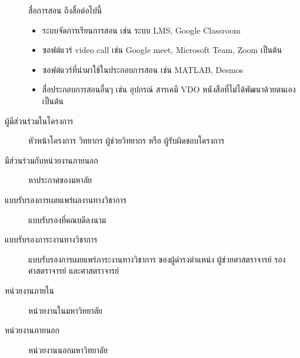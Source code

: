 \documentclass[a4paper,12pt,english]{sphinxmanual}
\begin{document}
\begin{description}
\begin{itemize}
\end{itemize}

สื่อการสอน  ถึงสื่อต่อไปนี้
\begin{itemize}
\item {} 
ระบบจัดการเรียนการสอน เช่น ระบบ LMS, Google Classroom

\item {} 
ซอฟต์แวร์ video call เช่น Google meet, Microsoft Team, Zoom เป็นต้น

\item {} 
ซอฟต์แวร์ที่นำมาใช้ในประกอบการสอน เช่น MATLAB, Desmos

\item {} 
สื่อประกอบการสอนอื่นๆ เช่น อุปกรณ์ สารเคมี VDO หนังสือที่ไม่ได้พัฒนาด้วยตนเอง เป็นต้น

\end{itemize}

\item[{ผู้มีส่วนร่วมในโครงการ\index{ผู้มีส่วนร่วมในโครงการ@\spxentry{ผู้มีส่วนร่วมในโครงการ}|spxpagem}\phantomsection\label{\detokenize{glossary:term-5}}}] \leavevmode
หัวหน้าโครงการ วิทยากร ผู้ช่วยวิทยากร หรือ ผู้รับผิดชอบโครงการ

\item[{มีส่วนร่วมกับหน่วยงานภายนอก\index{มีส่วนร่วมกับหน่วยงานภายนอก@\spxentry{มีส่วนร่วมกับหน่วยงานภายนอก}|spxpagem}\phantomsection\label{\detokenize{glossary:term-6}}}] \leavevmode
หาประกาศของมหาลัย

\item[{แบบรับรองการเผยแพร่ผลงานทางวิชาการ\index{แบบรับรองการเผยแพร่ผลงานทางวิชาการ@\spxentry{แบบรับรองการเผยแพร่ผลงานทางวิชาการ}|spxpagem}\phantomsection\label{\detokenize{glossary:term-7}}}] \leavevmode
แบบรับรองที่คณบดีลงนาม

\item[{แบบรับรองภาระงานทางวิชาการ\index{แบบรับรองภาระงานทางวิชาการ@\spxentry{แบบรับรองภาระงานทางวิชาการ}|spxpagem}\phantomsection\label{\detokenize{glossary:term-8}}}] \leavevmode
แบบรับรองการเผยแพร่ภาระงานทางวิชาการ ของผู้ดำรงตำแหน่ง ผู้ช่วยศาสตราจารย์ รองศาสตราจารย์ และศาสตราจารย์

\item[{หน่วยงานภายใน\index{หน่วยงานภายใน@\spxentry{หน่วยงานภายใน}|spxpagem}\phantomsection\label{\detokenize{glossary:term-9}}}] \leavevmode
หน่วยงานในมหาวิทยาลัย

\item[{หน่วยงานภายนอก\index{หน่วยงานภายนอก@\spxentry{หน่วยงานภายนอก}|spxpagem}\phantomsection\label{\detokenize{glossary:term-10}}}] \leavevmode
หน่วยงานนอกมหาวิทยาลัย


\end{description}
\end{document}

